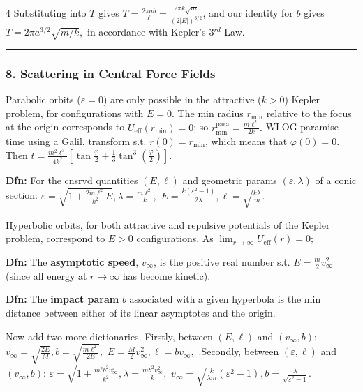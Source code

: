 \documentclass[landscape, 8pt]{extarticle}
\begin{document}
\begin{multicols*}{4}
		Substituting into $T$ gives $T=\frac{2\pi ab}{\ell}=\frac{2\pi k\sqrt{m}}{(2|E|)^{3/2}}$, and our identity for $b$ gives
		$
		T=2\pi a^{3/2}\sqrt{m/k},
		$
		in accordance with Kepler's 3$^{rd}$ Law.
		
		\hrule
		\vspace*{-3pt}
		\subsubsection*{\tiny{8. Scattering in Central Force Fields}}
		\vspace*{-5pt}
		
		Parabolic orbits ($\varepsilon=0$) are only possible in the attractive ($k>0$) Kepler problem, for configurations with $E=0$. The min radius $r_{\min}$ relative to the focus at the origin corresponds to $U_{\mathrm{eff}}(r_{\min})=0$; so
		$
		r_{\min}^{\mathrm{para}}=\frac{m\ell^2}{2k}.
		$
		WLOG paramise time using a Galil. transform s.t. $r(0)=r_{\min}$, which means that $\varphi(0)=0$. Then
		$
		t=\frac{m^2\ell^3}{4k^2}\left[\tan\frac{\varphi}{2}+\frac{1}{3}\tan^3\!\left(\frac{\varphi}{2}\right)\right].
		$
		
		\textbf{Dfn:} For the cnsrvd quantities $(E,\ell)$ and geometric params $(\varepsilon,\lambda)$ of a conic section:
		$
		\varepsilon=\sqrt{1+\frac{2m\ell^2}{k^2}E},\lambda=\frac{m\ell^2}{k},
		$
		$
		E=\frac{k(\varepsilon^2-1)}{2\lambda},\ell=\sqrt{\frac{k\lambda}{m}}.
		$
		
		Hyperbolic orbits, for both attractive and repulsive potentials of the Kepler problem, correspond to $E>0$ configurations. As $\lim_{r\to\infty}U_{\mathrm{eff}}(r)=0$;
		
		\textbf{Dfn:} The \textbf{asymptotic speed}, $v_\infty$, is the positive real number s.t. $E=\frac{m}{2}v_\infty^2$ (since all energy at $r\to\infty$ has become kinetic).
		
		\textbf{Dfn:} The \textbf{impact param} $b$ associated with a given hyperbola is the min distance between either of its linear asymptotes and the origin.
		
		Now add two more dictionaries. Firstly, between $(E,\ell)$ and $(v_\infty,b)$:
		$
		v_\infty=\sqrt{\frac{2E}{M}}, b=\sqrt{\frac{m\ell^2}{2E}},
		$
		$
		E=\frac{M}{2}v_\infty^2,\ell=bv_\infty,
		$
		.Secondly, between $(\varepsilon,\ell)$ and $(v_\infty,b)$:
		$
		\varepsilon=\sqrt{1+\frac{m^2b^2v_\infty^4}{k^2}},\lambda=\frac{mb^2v_\infty^2}{k},
		$
		$
		v_\infty=\sqrt{\frac{k}{\lambda m}(\varepsilon^2-1)}, b=\frac{\lambda}{\sqrt{\varepsilon^2-1}}.
		$
		

\end{multicols*}
\end{document}
